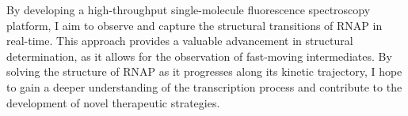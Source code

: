 By developing a high-throughput single-molecule fluorescence spectroscopy platform, I aim to observe and capture the structural transitions of RNAP in real-time. 
This approach provides a valuable advancement in structural determination, as it allows for the observation of fast-moving intermediates. 
By solving the structure of RNAP as it progresses along its kinetic trajectory, I hope to gain a deeper understanding of the transcription process and contribute to the development of novel therapeutic strategies.





